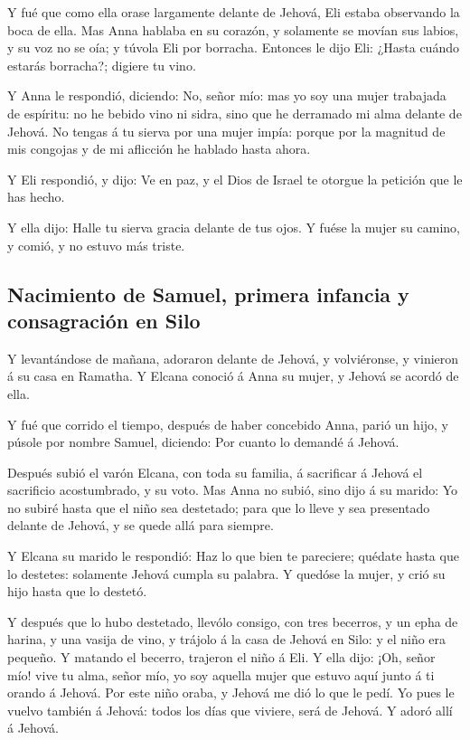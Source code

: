  Y fué que como ella orase largamente delante de Jehová,
Eli estaba observando la boca de ella.  Mas Anna hablaba
en su corazón, y solamente se movían sus labios, y su voz no se oía; y
túvola Eli por borracha.  Entonces le dijo Eli: ¿Hasta
cuándo estarás borracha?; digiere tu vino.

 Y Anna le respondió, diciendo: No, señor mío: mas yo soy
una mujer trabajada de espíritu: no he bebido vino ni sidra, sino que he
derramado mi alma delante de Jehová.  No tengas á tu
sierva por una mujer impía: porque por la magnitud de mis congojas y de
mi aflicción he hablado hasta ahora.

 Y Eli respondió, y dijo: Ve en paz, y el Dios de Israel
te otorgue la petición que le has hecho.

 Y ella dijo: Halle tu sierva gracia delante de tus ojos.
Y fuése la mujer su camino, y comió, y no estuvo más triste.

\hypertarget{nacimiento-de-samuel-primera-infancia-y-consagraciuxf3n-en-silo}{%
\subsection{Nacimiento de Samuel, primera infancia y consagración en
Silo}\label{nacimiento-de-samuel-primera-infancia-y-consagraciuxf3n-en-silo}}

 Y levantándose de mañana, adoraron delante de Jehová, y
volviéronse, y vinieron á su casa en Ramatha. Y Elcana conoció á Anna su
mujer, y Jehová se acordó de ella.

 Y fué que corrido el tiempo, después de haber concebido
Anna, parió un hijo, y púsole por nombre Samuel, diciendo: Por cuanto lo
demandé á Jehová.

 Después subió el varón Elcana, con toda su familia, á
sacrificar á Jehová el sacrificio acostumbrado, y su voto.
 Mas Anna no subió, sino dijo á su marido: Yo no subiré
hasta que el niño sea destetado; para que lo lleve y sea presentado
delante de Jehová, y se quede allá para siempre.

 Y Elcana su marido le respondió: Haz lo que bien te
pareciere; quédate hasta que lo destetes: solamente Jehová cumpla su
palabra. Y quedóse la mujer, y crió su hijo hasta que lo destetó.

 Y después que lo hubo destetado, llevólo consigo, con
tres becerros, y un epha de harina, y una vasija de vino, y trájolo á la
casa de Jehová en Silo: y el niño era pequeño.  Y matando
el becerro, trajeron el niño á Eli.  Y ella dijo: ¡Oh,
señor mío! vive tu alma, señor mío, yo soy aquella mujer que estuvo aquí
junto á ti orando á Jehová.  Por este niño oraba, y
Jehová me dió lo que le pedí.  Yo pues le vuelvo también
á Jehová: todos los días que viviere, será de Jehová. Y adoró allí á
Jehová.

